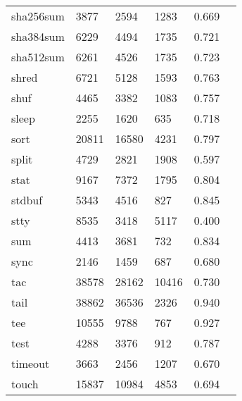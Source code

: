 \begin{longtable}{lp{2.20cm}p{2.20cm}p{2.20cm}p{2.20cm}p{2.20cm}}
sha256sum &                     3877 &         2594 &          1283 &                    0.669 \\
sha384sum &                     6229 &         4494 &          1735 &                    0.721 \\
sha512sum &                     6261 &         4526 &          1735 &                    0.723 \\
shred     &                     6721 &         5128 &          1593 &                    0.763 \\
shuf      &                     4465 &         3382 &          1083 &                    0.757 \\
sleep     &                     2255 &         1620 &           635 &                    0.718 \\
sort      &                    20811 &        16580 &          4231 &                    0.797 \\
split     &                     4729 &         2821 &          1908 &                    0.597 \\
stat      &                     9167 &         7372 &          1795 &                    0.804 \\
stdbuf    &                     5343 &         4516 &           827 &                    0.845 \\
stty      &                     8535 &         3418 &          5117 &                    0.400 \\
sum       &                     4413 &         3681 &           732 &                    0.834 \\
sync      &                     2146 &         1459 &           687 &                    0.680 \\
tac       &                    38578 &        28162 &         10416 &                    0.730 \\
tail      &                    38862 &        36536 &          2326 &                    0.940 \\
tee       &                    10555 &         9788 &           767 &                    0.927 \\
test      &                     4288 &         3376 &           912 &                    0.787 \\
timeout   &                     3663 &         2456 &          1207 &                    0.670 \\
touch     &                    15837 &        10984 &          4853 &                    0.694 \\

\end{longtable}
